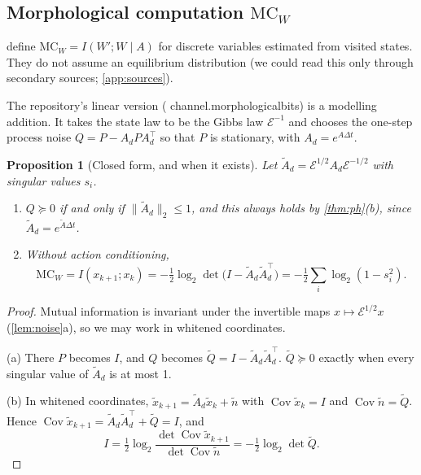 \documentclass[11pt]{article}
\newtheorem{proposition}[theorem]{Proposition}
\theoremstyle{definition}
\theoremstyle{remark}
\newcommand{\Cov}{\operatorname{Cov}}
\newcommand{\Em}{\mathcal{E}}         %
\newcommand{\At}{\tilde{A}}
\newcommand{\codeus}{\textunderscore\allowbreak}
\newcommand{\code}[1]{{\ttfamily\let\_\codeus\hyphenchar\font=-1 #1}}
\begin{document}
\subsection{Morphological computation \texorpdfstring{$\mathrm{MC}_W$}{MCW}}
\label{sec:mcw}

\citet{zahedi2013quantifying} define $\mathrm{MC}_W=I(W';W\mid A)$ for discrete variables
estimated from visited states. They do not assume an equilibrium distribution (we could
read this only through secondary sources; \cref{app:sources}).

The repository's linear version (\code{channel.morphological\_bits}) is a modelling
addition. It takes the state law to be the Gibbs law $\Em^{-1}$ and chooses the one-step
process noise $Q=P-A_dPA_d^\top$ so that $P$ is stationary, with $A_d=e^{A\Delta t}$.

\begin{proposition}[Closed form, and when it exists]\label{prop:mcw}
Let $\At_d=\Em^{1/2}A_d\Em^{-1/2}$ with singular values $s_i$.
\begin{enumerate}[label=(\alph*)]
  \item $Q\succeq0$ if and only if $\|\At_d\|_2\le1$, and this always holds by
        \cref{thm:ph}(b), since $\At_d=e^{\At\Delta t}$.
  \item Without action conditioning,
        \[
          \mathrm{MC}_W=I(x_{k+1};x_k)=-\tfrac12\log_2\det\big(I-\At_d\At_d^\top\big)
          =-\tfrac12\sum_i\log_2(1-s_i^2).
        \]
\end{enumerate}
\end{proposition}
\begin{proof}
Mutual information is invariant under the invertible maps $x\mapsto\Em^{1/2}x$
(\cref{lem:noise}a), so we may work in whitened coordinates.

(a) There $P$ becomes $I$, and $Q$ becomes $\tilde Q=I-\At_d\At_d^\top$.
$\tilde Q\succeq0$ exactly when every singular value of $\At_d$ is at most 1.

(b) In whitened coordinates, $\tilde x_{k+1}=\At_d\tilde x_k+\tilde n$ with
$\Cov\tilde x_k=I$ and $\Cov\tilde n=\tilde Q$. Hence $\Cov\tilde x_{k+1}=\At_d\At_d^\top+
\tilde Q=I$, and
\[
  I=\tfrac12\log_2\frac{\det\Cov\tilde x_{k+1}}{\det\Cov\tilde n}
   =-\tfrac12\log_2\det\tilde Q .
\]
\end{proof}
\end{document}
